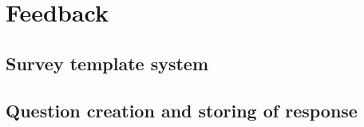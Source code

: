 \chapter{Feedback}
 
\section{Survey template system}

\section{Question creation and storing of response}
